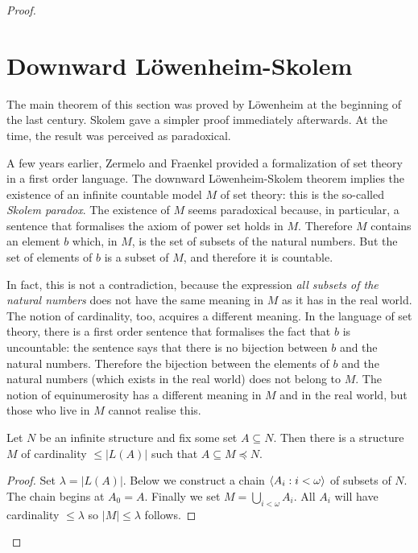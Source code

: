 \begin{proof}
\section{Downward Löwenheim-Skolem}
\label{LoewenheimSkolem}


The main theorem of this section was proved by L\"owenheim at the beginning of the last century.
Skolem gave a simpler proof immediately afterwards.
At the time, the result was perceived as paradoxical.

A few years earlier, Zermelo and Fraenkel provided a formalization of set theory in a first order language.
The downward L\"owenheim-Skolem theorem implies the existence of an infinite countable model $M$ of set theory: this is the so-called  \emph{Skolem paradox}.
The existence of  $M$ seems paradoxical because, in particular, a sentence that formalises the axiom of power set holds in $M$.
Therefore $M$ contains an element $b$ which, in $M$, is the set of subsets of the natural numbers.
But the set of elements of $b$ is a subset of $M$, and therefore it is countable.

In fact, this is not a contradiction, because the expression \textit{all subsets of the natural numbers\/} does not have the same meaning in $M$ as it has in the real world.
The notion of cardinality, too, acquires a different meaning.
In the language of set theory, there is a first order sentence that formalises the fact that $b$ is uncountable: the sentence says that there is no bijection between $b$ and the natural numbers.
Therefore the bijection between the elements of $b$ and the natural numbers (which exists in the real world) does not belong to $M$.
The notion of equinumerosity has a different meaning in $M$ and in the real world, but those who live in $M$ cannot realise this.

\begin{theorem}\label{thm_lowenheimskolemallingiu}
Let $N$ be an infinite structure and fix some set $A\subseteq N$.
Then there is a structure $M$ of cardinality $\le|L(A)|$ such that $A\subseteq M\preceq N$.
\end{theorem}

\begin{proof}
Set $\lambda=|L(A)|$.
Below we construct a chain $\langle A_i:i<\omega\rangle$ of subsets of $N$.
The chain begins at $A_0=A$.
Finally we set $M=\bigcup_{i<\omega}A_i$.
All $A_i$ will have cardinality $\le\lambda$ so  $|M|\le\lambda$ follows.


\end{proof}
\end{proof}
